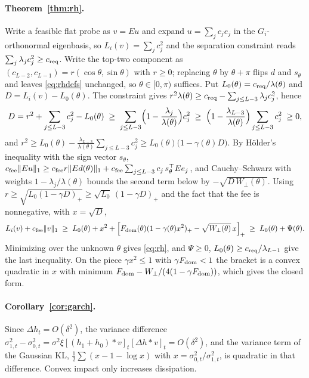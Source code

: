 \documentclass[12pt]{article}
\theoremstyle{definition}
\theoremstyle{remark}
\begin{document}
\paragraph{Theorem~\ref{thm:rh}.} Write a feasible flat probe as $v=Eu$ and expand $u=\sum_jc_je_j$ in the $G_i$-orthonormal eigenbasis, so $L_i(v)=\sum_jc_j^2$ and the separation constraint reads $\sum_j\lambda_jc_j^2\ge c_{\rm req}$. Write the top-two component as $(c_{L-2},c_{L-1})=r(\cos\theta,\sin\theta)$ with $r\ge0$; replacing $\theta$ by $\theta+\pi$ flips $d$ and $s_\theta$ and leaves \eqref{eq:rhdefs} unchanged, so $\theta\in[0,\pi)$ suffices. Put $L_0(\theta)=c_{\rm req}/\lambda(\theta)$ and $D=L_i(v)-L_0(\theta)$. The constraint gives $r^2\lambda(\theta)\ge c_{\rm req}-\sum_{j\le L-3}\lambda_jc_j^2$, hence
\[
D=r^2+\sum_{j\le L-3}c_j^2-L_0(\theta)\;\ge\;\sum_{j\le L-3}\Bigl(1-\frac{\lambda_j}{\lambda(\theta)}\Bigr)c_j^2\;\ge\;\Bigl(1-\frac{\lambda_{L-3}}{\lambda(\theta)}\Bigr)\sum_{j\le L-3}c_j^2\;\ge0,
\]
and $r^2\ge L_0(\theta)-\frac{\lambda_{L-3}}{\lambda(\theta)}\sum_{j\le L-3}c_j^2\ge L_0(\theta)\bigl(1-\gamma(\theta)D\bigr)$. By H\"older's inequality with the sign vector $s_\theta$, $c_{\rm fee}\|Eu\|_1\ge c_{\rm fee}r\|Ed(\theta)\|_1+c_{\rm fee}\sum_{j\le L-3}c_j\,s_\theta^\top Ee_j$, and Cauchy--Schwarz with weights $1-\lambda_j/\lambda(\theta)$ bounds the second term below by $-\sqrt{D\,W_\perp(\theta)}$. Using $r\ge\sqrt{L_0(1-\gamma D)_+}\ge\sqrt{L_0}\,(1-\gamma D)_+$ and the fact that the fee is nonnegative, with $x=\sqrt D$,
\[
L_i(v)+c_{\rm fee}\|v\|_1\;\ge\;L_0(\theta)+x^2+\Bigl[F_{\rm dom}(\theta)(1-\gamma(\theta)x^2)_+-\sqrt{W_\perp(\theta)}\,x\Bigr]_+\;\ge\;L_0(\theta)+\Psi(\theta).
\]
Minimizing over the unknown $\theta$ gives \eqref{eq:rh}, and $\Psi\ge0$, $L_0(\theta)\ge c_{\rm req}/\lambda_{L-1}$ give the last inequality. On the piece $\gamma x^2\le1$ with $\gamma F_{\rm dom}<1$ the bracket is a convex quadratic in $x$ with minimum $F_{\rm dom}-W_\perp/(4(1-\gamma F_{\rm dom}))$, which gives the closed form.

\paragraph{Corollary~\ref{cor:garch}.} Since $\Delta h_t=O(\delta^2)$, the variance difference $\sigma^2_{1,t}-\sigma^2_{0,t}=\sigma^2\xi[(h_1+h_0)*v]_t[\Delta h*v]_t=O(\delta^2)$, and the variance term of the Gaussian KL, $\tfrac12\sum(x-1-\log x)$ with $x=\sigma^2_{0,t}/\sigma^2_{1,t}$, is quadratic in that difference. Convex impact only increases dissipation.
\end{document}
